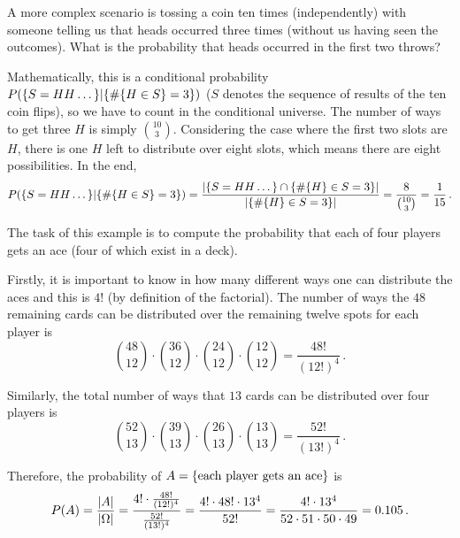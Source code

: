 \begin{ex}
A more complex scenario is tossing a coin ten times (independently) with someone telling us that heads occurred three times (without us having seen the outcomes). What is the probability that heads occurred in the first two throws?

Mathematically, this is a conditional probability $P\qty(\{S = HH \dots\} | \{\#\{H \in S\} = 3\})$ ($S$ denotes the sequence of results of the ten coin flips), so we have to count in the conditional universe. The number of ways to get three $H$ is simply $\binom{10}{3}$. Considering the case where the first two slots are $H$, there is one $H$ left to distribute over eight slots, which means there are eight possibilities. In the end,
\begin{equation*}
P\qty(\{S = HH \dots\} | \{\#\{H \in S\} = 3\}) = \frac{\abs{\qty{S = HH \dots} \cap \qty{\#\qty{H} \in S = 3}}}{\abs{\qty{\#\qty{H} \in S = 3}}} = \frac{8}{\binom{10}{3}} = \frac{1}{15} \, .
\end{equation*}
\end{ex}


\begin{ex}
The task of this example is to compute the probability that each of four players gets an ace (four of which exist in a deck).

Firstly, it is important to  know in how many different ways one can distribute the aces and this is $4!$ (by definition of the factorial). The number of ways the $48$ remaining cards can be distributed over the remaining twelve spots for each player is
\begin{equation*}
\binom{48}{12} \cdot \binom{36}{12} \cdot \binom{24}{12} \cdot \binom{12}{12} = \frac{48!}{(12!)^4} \, .
\end{equation*}

Similarly, the total number of ways that $13$ cards can be distributed over four players is
\begin{equation*}
\binom{52}{13} \cdot \binom{39}{13} \cdot \binom{26}{13} \cdot \binom{13}{13} = \frac{52!}{(13!)^4} \, .
\end{equation*}

Therefore, the probability of $A = \qty{\text{each player gets an ace}}$ is
\begin{equation*}
P(A) = \frac{\abs{A}}{\abs{\Omega}} = \frac{4! \cdot \frac{48!}{(12!)^4}}{\frac{52!}{(13!)^4}} = \frac{4! \cdot 48! \cdot 13^4}{52!} = \frac{4! \cdot 13^4}{52 \cdot 51 \cdot 50 \cdot 49} = 0.105 \, .
\end{equation*}
\end{ex}



